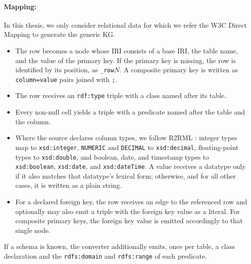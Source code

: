 \paragraph{Mapping:}
In this thesis, we only consider relational data for which we refer the W3C Direct Mapping \citep{w3c2012directmapping} to generate the generic KG\@. 
\begin{itemize}
  \item The row becomes a node whose IRI consists of a base IRI, the table name, and the value of the primary key. If the primary key is missing, the row is identified by its position, as \texttt{\_row}\(N\). A composite primary key is written as \texttt{column=value} pairs joined with \texttt{;}. 
  \item The row receives an \texttt{rdf:type} triple with a class named after its table.
  \item Every non-null cell yields a triple with a predicate named after the table and the column. 
  \item Where the source declares column types, we follow R2RML \citep{das2012r2rml}: integer types map to \texttt{xsd:integer}, \texttt{NUMERIC} and \texttt{DECIMAL} to \texttt{xsd:decimal}, floating-point types to \texttt{xsd:double}, and boolean, date, and timestamp types to \texttt{xsd:boolean}, \texttt{xsd:date}, and \texttt{xsd:dateTime}. A value receives a datatype only if it also matches that datatype's lexical form; otherwise, and for all other cases, it is written as a plain string.
  \item For a declared foreign key, the row receives an edge to the referenced row and optionally may also emit a triple with the foreign key value as a literal. For composite primary keys, the foreign key value is emitted accordingly to that single node. 
\end{itemize}
If a schema is known, the converter additionally emits, once per table, a class declaration and the \texttt{rdfs:domain} and \texttt{rdfs:range} of each predicate.


